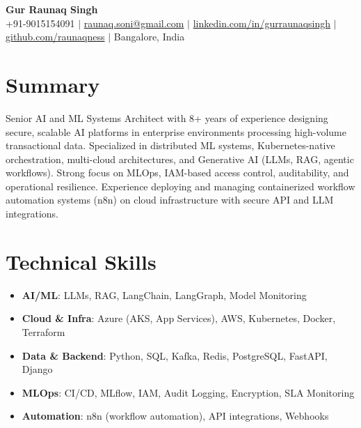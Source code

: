 \documentclass[letterpaper,10pt]{article}
\newcommand{\resumeItem}[1]{\item\small{#1}}
\newcommand{\resumeSubHeadingList}{\begin{itemize}[leftmargin=0.15in, label={}]}
\newcommand{\resumeSubHeadingListEnd}{\end{itemize}}
\begin{document}
\begin{center}
  \textbf{\Huge Gur Raunaq Singh} \\
  \small +91-9015154091 $|$ \href{mailto:raunaq.soni@gmail.com}{raunaq.soni@gmail.com} $|$
  \href{https://www.linkedin.com/in/gurraunaqsingh/}{linkedin.com/in/gurraunaqsingh} $|$
  \href{https://github.com/raunaqness}{github.com/raunaqness} $|$ Bangalore, India
\end{center}

\section*{Summary}
Senior AI and ML Systems Architect with 8+ years of experience designing secure, scalable AI platforms in enterprise environments processing high-volume transactional data. Specialized in distributed ML systems, Kubernetes-native orchestration, multi-cloud architectures, and Generative AI (LLMs, RAG, agentic workflows). Strong focus on MLOps, IAM-based access control, auditability, and operational resilience. Experience deploying and managing containerized workflow automation systems (n8n) on cloud infrastructure with secure API and LLM integrations.

\section{Technical Skills}
\resumeSubHeadingList
  \resumeItem{\textbf{AI/ML}: LLMs, RAG, LangChain, LangGraph, Model Monitoring}
  \resumeItem{\textbf{Cloud \& Infra}: Azure (AKS, App Services), AWS, Kubernetes, Docker, Terraform}
  \resumeItem{\textbf{Data \& Backend}: Python, SQL, Kafka, Redis, PostgreSQL, FastAPI, Django}
  \resumeItem{\textbf{MLOps}: CI/CD, MLflow, IAM, Audit Logging, Encryption, SLA Monitoring}
  \resumeItem{\textbf{Automation}: n8n (workflow automation), API integrations, Webhooks}
\resumeSubHeadingListEnd
\end{document}
